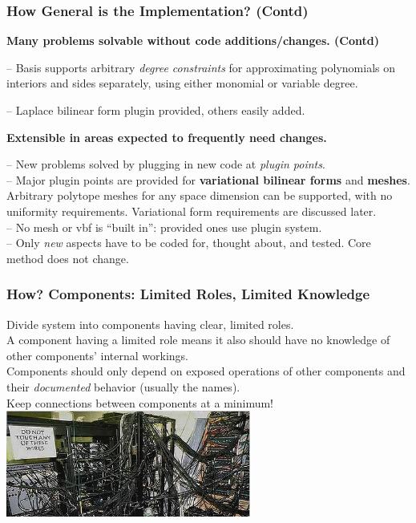 \documentclass[compress]{beamer}
\begin{document}
\begin{frame}
  \frametitle{How General is the Implementation? (Contd)}
  \textbf{Many problems solvable without code additions/changes. (Contd)}
  
  \uncover<+-> {
  \vspace{0.15cm}
  -- Basis supports arbitrary \emph{degree constraints} for approximating polynomials on interiors and sides separately,
      using either monomial or variable degree.\\
  \uncover<+-> {
  -- Laplace bilinear form plugin provided, others easily added.

  \vspace{0.15cm}
  \uncover<+-> {
  \textbf{Extensible in areas expected to frequently need changes.}

  \vspace{0.15cm}
  \uncover<+-> {
  -- New problems solved by plugging in new code at \emph{plugin points}.\\
  \uncover<+-> {
  -- Major plugin points are provided for \textbf{variational bilinear forms} and \textbf{meshes}.
     Arbitrary polytope meshes for any space dimension can be supported, with no uniformity requirements.
     Variational form requirements are discussed later.\\
  \uncover<+-> {
  -- No mesh or vbf is ``built in'': provided ones use plugin system.\\
  \uncover<+-> {
  -- Only \emph{new} aspects have to be coded for, thought about, and tested. Core method does not change.
  }}}}}}}
\end{frame}
  
\begin{frame}
  \frametitle{How? Components: Limited Roles, Limited Knowledge}
  Divide system into components having clear, limited roles.
  \pause
   \raisebox{3mm}{$\implies$} \\
  A component having a limited role means it also should have no knowledge of other components' internal workings.\\
  \pause
  Components should only depend on exposed operations of other components and their \emph{documented} behavior (usually the names).\\
  \pause
  Keep connections between components at a minimum!
  \includegraphics[height=3.5cm]{img/crazy-wiring.jpg}
\end{frame}
\end{document}
